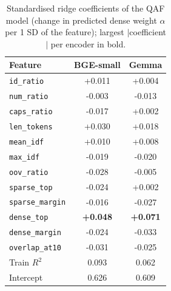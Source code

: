 \begin{table}[t]
\centering
\caption{Standardised ridge coefficients of the QAF model (change in predicted dense weight $\alpha$ per 1 SD of the feature); largest $|$coefficient$|$ per encoder in bold.}
\label{tab:qaf_coefficients}
\scriptsize
\setlength{\tabcolsep}{3pt}
\begin{tabular}{lcc}
\toprule
Feature & BGE-small & Gemma \\
\midrule
\texttt{id\_ratio} & +0.011 & +0.004 \\
\texttt{num\_ratio} & -0.003 & -0.013 \\
\texttt{caps\_ratio} & -0.017 & +0.002 \\
\texttt{len\_tokens} & +0.030 & +0.018 \\
\texttt{mean\_idf} & +0.010 & +0.008 \\
\texttt{max\_idf} & -0.019 & -0.020 \\
\texttt{oov\_ratio} & -0.028 & -0.005 \\
\texttt{sparse\_top} & -0.024 & +0.002 \\
\texttt{sparse\_margin} & -0.016 & -0.027 \\
\texttt{dense\_top} & \textbf{+0.048} & \textbf{+0.071} \\
\texttt{dense\_margin} & -0.024 & -0.033 \\
\texttt{overlap\_at10} & -0.031 & -0.025 \\
\midrule
Train $R^2$ & 0.093 & 0.062 \\
Intercept & 0.626 & 0.609 \\
\bottomrule
\end{tabular}
\end{table}
